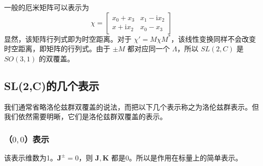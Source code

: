 一般的厄米矩阵可以表示为
\begin{equation}
\chi=\left[\begin{array}{cc}
x_0+x_3 & x_1-\mathrm{i} x_2 \\
x+\mathrm{i}x_2 & x_0-x_3
\end{array}\right]
\end{equation}
显然，该矩阵行列式即为时空距离。对于 $\chi'=M \chi M^{*}$，该线性变换同样不会改变时空距离，即矩阵的行列式。由于 $\pm M$ 都对应同一个 $\Lambda$，所以 $SL(2,C)$ 是 $SO(3,1)$ 的双覆盖。

\subsection{SL(2,C)的几个表示}
我们通常省略洛伦兹群双覆盖的说法，而把以下几个表示称之为洛伦兹群表示。但我们依然需要明晰，它们是洛伦兹群双覆盖的表示。

\subsubsection{（$0,0$）表示}
该表示维数为1。$\mathbf{J}^{\pm}=0$，则 $\mathbf{J},\mathbf{K}$ 都是0。所以是作用在标量上的简单表示。

